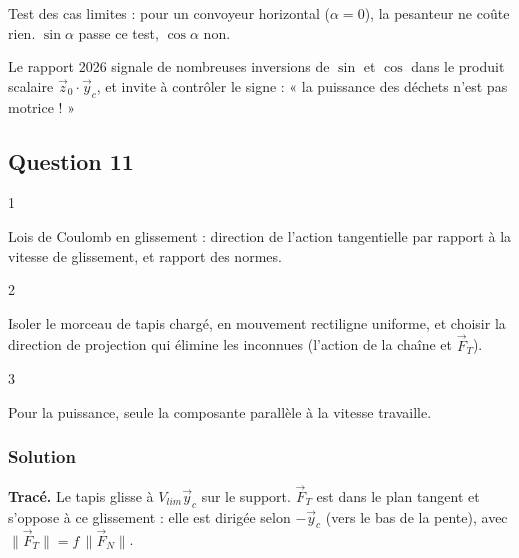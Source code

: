 \documentclass[11pt,a4paper]{article}
\begin{document}
\begin{methode}

Test des cas limites : pour un convoyeur horizontal (\(\alpha=0\)), la pesanteur ne coûte rien. \(\sin\alpha\) passe ce test, \(\cos\alpha\) non.

\end{methode}

\begin{jury}

Le rapport 2026 signale de nombreuses inversions de \(\sin\) et \(\cos\) dans le produit scalaire \(\vec z_0\cdot\vec y_c\), et invite à contrôler le signe : « la puissance des déchets n'est pas motrice ! »

\end{jury}

\hypertarget{question-11}{%
\subsection{Question 11}\label{question-11}}

\begin{indication}{1}

Lois de Coulomb en glissement : direction de l'action tangentielle par rapport à la vitesse de glissement, et rapport des normes.

\end{indication}

\begin{indication}{2}

Isoler le morceau de tapis chargé, en mouvement rectiligne uniforme, et choisir la direction de projection qui élimine les inconnues (l'action de la chaîne et \(\vec F_T\)).

\end{indication}

\begin{indication}{3}

Pour la puissance, seule la composante parallèle à la vitesse travaille.

\end{indication}

\hypertarget{solution-10}{%
\subsubsection{Solution}\label{solution-10}}

\textbf{Tracé.} Le tapis glisse à \(V_{lim}\vec y_c\) sur le support. \(\vec F_T\) est dans le plan tangent et s'oppose à ce glissement : elle est dirigée selon \(-\vec y_c\) (vers le bas de la pente), avec \(\|\vec F_T\|=f\,\|\vec F_N\|\).
\end{document}
